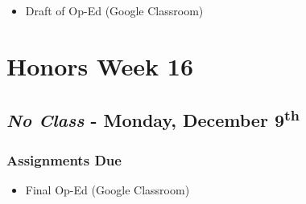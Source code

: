 \documentclass[]{book}
\providecommand{\tightlist}{%
  \setlength{\itemsep}{0pt}\setlength{\parskip}{0pt}}
\begin{document}
\begin{itemize}
\tightlist
\item
  Draft of Op-Ed (Google Classroom)
\end{itemize}

\hypertarget{honors-week-16}{%
\section*{Honors Week 16}\label{honors-week-16}}

\hypertarget{no-class---monday-december-9th}{%
\subsection*{\texorpdfstring{\emph{No Class} - Monday, December 9\textsuperscript{th}}{No Class - Monday, December 9th}}\label{no-class---monday-december-9th}}

\hypertarget{assignments-due-9}{%
\subsubsection*{Assignments Due}\label{assignments-due-9}}

\begin{itemize}
\tightlist
\item
  Final Op-Ed (Google Classroom)
\end{itemize}


\end{document}
